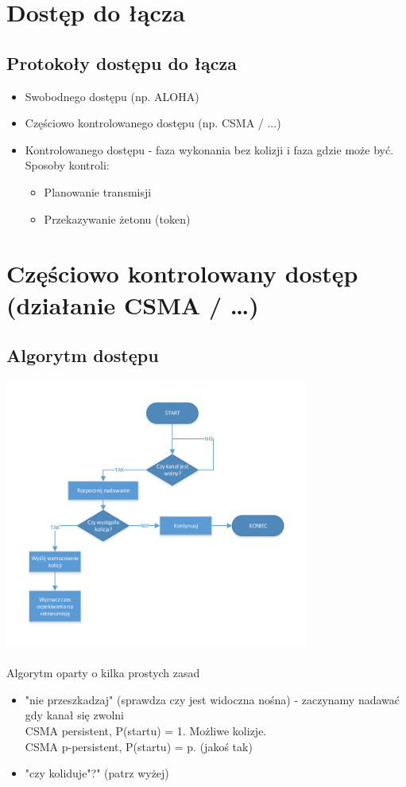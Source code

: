 	\section{Dostęp do łącza}
		\subsection{Protokoły dostępu do łącza}
			\begin{itemize}
				\item Swobodnego dostępu (np. ALOHA)
				\item Częściowo kontrolowanego dostępu (np. CSMA / ...)
				\item Kontrolowanego dostępu - faza wykonania bez kolizji i faza gdzie może być.\\Sposoby kontroli:
				\begin{itemize}
					\item Planowanie transmisji
					\item Przekazywanie żetonu (token)
				\end{itemize}
			\end{itemize}
	\section{Częściowo kontrolowany dostęp (działanie CSMA / …)}
		\subsection{Algorytm dostępu}
			\includegraphics[width=10cm]{./images/image20.pdf}\\\\
			Algorytm oparty o kilka prostych zasad
			\begin{itemize}
				\item "nie przeszkadzaj" (sprawdza czy jest widoczna nośna) - zaczynamy nadawać gdy kanał się zwolni\\
				CSMA persistent, P(startu) = 1. Możliwe kolizje.\\
				CSMA p-persistent, P(startu) = p. (jakoś tak)
				\item "czy koliduje"?" (patrz wyżej)
			\end{itemize}
